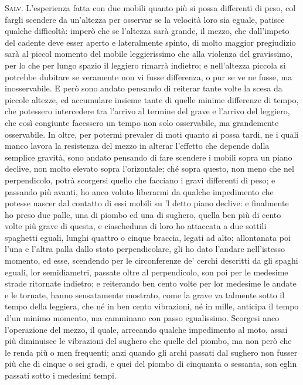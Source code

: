 \documentclass[11pt,twoside,openany]{book}
\newcommand{\speaker}[1]{\textcolor{rubric}{\textsc{#1}}\space}
\begin{document}
\speaker{Salv.} L'esperienza fatta con due mobili quanto più si possa differenti di peso, col fargli scendere da un'altezza per osservar se la velocità loro sia eguale, patisce qualche difficoltà: imperò che se l'altezza sarà grande, il mezzo, che dall'impeto del cadente deve esser aperto e lateralmente spinto, di molto maggior pregiudizio sarà al piccol momento del mobile leggierissimo che alla violenza del gravissimo, per lo che per lungo spazio il leggiero rimarrà indietro; e nell'altezza piccola si potrebbe dubitare se veramente non vi fusse differenza, o pur se ve ne fusse, ma inosservabile. E però sono andato pensando di reiterar tante volte la scesa da piccole altezze, ed accumulare insieme tante di quelle minime differenze di tempo, che potessero intercedere tra l'arrivo al termine del grave e l'arrivo del leggiero, che così congiunte facessero un tempo non solo osservabile, ma grandemente osservabile. In oltre, per potermi prevaler di moti quanto si possa tardi, ne i quali manco lavora la resistenza del mezzo in alterar l'effetto che depende dalla semplice gravità, sono andato pensando di fare scendere i mobili sopra un piano declive, non molto elevato sopra l'orizontale; ché sopra questo, non meno che nel perpendicolo, potrà scorgersi quello che facciano i gravi differenti di peso; e passando più avanti, ho anco voluto liberarmi da qualche impedimento che potesse nascer dal contatto di essi mobili su 'l detto piano declive: e finalmente ho preso due palle, una di piombo ed una di sughero, quella ben più di cento volte più grave di questa, e ciascheduna di loro ho attaccata a due sottili spaghetti eguali, lunghi quattro o cinque braccia, legati ad alto; allontanata poi l'una e l'altra palla dallo stato perpendicolare, gli ho dato l'andare nell'istesso momento, ed esse, scendendo per le circonferenze de' cerchi descritti da gli spaghi eguali, lor semidiametri, passate oltre al perpendicolo, son poi per le medesime strade ritornate indietro; e reiterando ben cento volte per lor medesime le andate e le tornate, hanno sensatamente mostrato, come la grave va talmente sotto il tempo della leggiera, che né in ben cento vibrazioni, né in mille, anticipa il tempo d'un minimo momento, ma camminano con passo egualissimo. Scorgesi anco l'operazione del mezzo, il quale, arrecando qualche impedimento al moto, assai più diminuisce le vibrazioni del sughero che quelle del piombo, ma non però che le renda più o men frequenti; anzi quando gli archi passati dal sughero non fusser più che di cinque o sei gradi, e quei del piombo di cinquanta o sessanta, son eglin passati sotto i medesimi tempi.
\end{document}
